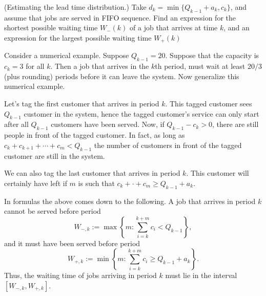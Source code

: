 \begin{exercise} (Estimating the lead time distribution.)  Take
  $d_k = \min\{Q_{k-1}+a_k, c_k\}$, and assume that jobs are served in
  FIFO sequence. Find an expression for the shortest possible waiting
  time $W_-(k)$ of a job that arrives at time $k$, and an expression
  for the largest possible waiting time $W_+(k)$
  \begin{hint}
  Consider a numerical example. Suppose $Q_{k-1}=20$. Suppose
    that the capacity is $c_k=3$ for all $k$. Then a job that arrives
    in the $k$th period, must wait at least $20/3$ (plus rounding)
    periods before it can leave the system. Now generalize this
    numerical example.
  \end{hint}
    \begin{solution}
      Let's tag the first customer that arrives in period $k$. This
      tagged customer sees $Q_{k-1}$ customer in the system, hence the
      tagged customer's service can only start after all $Q_{k-1}$
      customers have been served.  Now, if $Q_{k-1}-c_k >0$, there are
      still people in front of the tagged customer. In fact, as long
      as $c_k+c_{k+1}+\cdots +c_m < Q_{k-1}$ the number of customers in
      front of the tagged customer are still in the system.

      We can also tag the last customer that arrives in period
      $k$. This customer will certainly have left if $m$ is such that
      $c_k+\cdot+c_m \geq Q_{k-1}+a_k$.

      In formulas the above comes down to the following.  A job that
      arrives in period $k$ cannot be served before period
    \begin{equation*}
    W_{-,k}:= \max\left\{m: \sum_{i=k}^{k+m} c_i < Q_{k-1}\right\},
    \end{equation*}
    and it must have been served before period
    \begin{equation*}
      W_{+,k}:= \min\left\{m: \sum_{i=k}^{k+m} c_i \geq
        Q_{k-1}+a_k\right\}.
    \end{equation*}
    Thus, the waiting time of jobs arriving in period $k$ must lie in
    the interval $[W_{-,k}, W_{+,k}]$.
  \end{solution}
\end{exercise}

